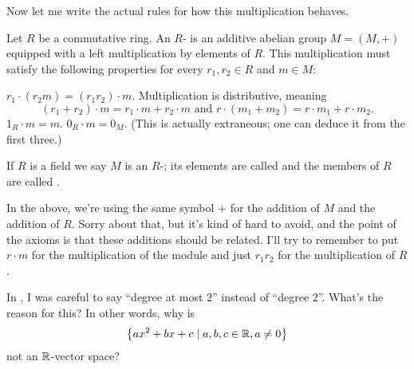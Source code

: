 Now let me write the actual rules for how this multiplication behaves.
\begin{definition}
	Let $R$ be a commutative ring.
	An $R$- is an additive abelian group
	$M = (M,+)$ equipped with a left multiplication by elements of $R$.
	This multiplication must satisfy the following properties
	for every $r_1, r_2 \in R$ and $m \in M$:
	\begin{enumerate}[(i)]
		\ii $r_1 \cdot (r_2 m) = (r_1r_2) \cdot m$.
		\ii Multiplication is distributive, meaning
		\[ (r_1+r_2) \cdot m = r_1 \cdot m + r_2 \cdot m 
			\text{ and }
			r \cdot (m_1 + m_2) = r \cdot m_1 + r \cdot m_2. \]
		\ii $1_R \cdot m = m$.
		\ii $0_R \cdot m = 0_M$. (This is actually extraneous;
		one can deduce it from the first three.)
	\end{enumerate}
	If $R$ is a field we say $M$ is an $R$-;
	its elements are called 
	and the members of $R$ are called .
\end{definition}

\begin{abuse}
	In the above, we're using the same symbol $+$ for the addition of $M$
	and the addition of $R$.
	Sorry about that, but it's kind of hard to avoid, and the point
	of the axioms is that these additions should be related.
	I'll try to remember to put $r \cdot m$ for the multiplication of the module
	and just $r_1r_2$ for the multiplication of $R$.
\end{abuse}

\begin{ques}
	In ,
	I was careful to say ``degree at most $2$'' instead of ``degree $2$''.
	What's the reason for this?
	In other words, why is
	\[ \left\{ ax^2 + bx + c \mid a,b,c \in \mathbb R, a \neq 0  \right\} \]
	not an $\mathbb R$-vector space?
\end{ques}

